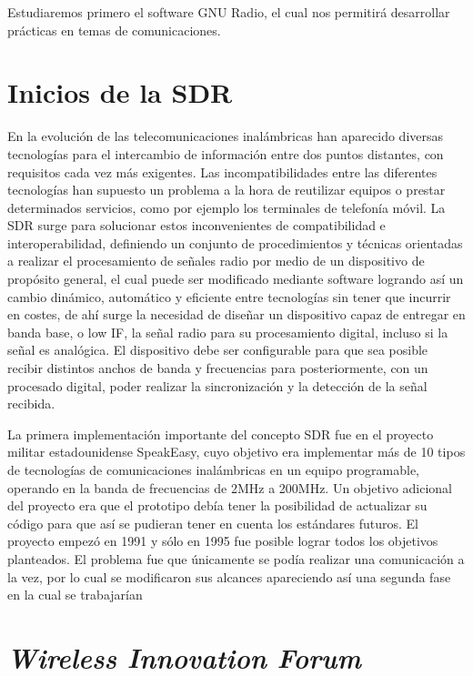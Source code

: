 Estudiaremos primero el software GNU Radio, el cual nos permitirá desarrollar prácticas en temas de comunicaciones.

\section{Inicios de la SDR}

En la evolución de las telecomunicaciones inalámbricas han aparecido diversas tecnologías
para el intercambio de información entre dos puntos distantes, con requisitos cada vez más
exigentes. Las incompatibilidades entre las diferentes tecnologías han supuesto un problema a la hora de reutilizar equipos o prestar determinados servicios, como por ejemplo los terminales de telefonía móvil. La SDR surge para solucionar estos inconvenientes de compatibilidad e interoperabilidad, definiendo un conjunto de procedimientos y técnicas orientadas a realizar el procesamiento de señales radio por medio de un dispositivo de propósito general, el cual puede ser modificado mediante software logrando así un cambio dinámico, automático y eficiente entre tecnologías sin tener que incurrir en costes, de ahí surge la necesidad de diseñar un dispositivo capaz de entregar en banda base, o low IF, la señal radio para su procesamiento digital, incluso si la señal es analógica. El dispositivo debe ser configurable para que sea posible recibir distintos anchos de banda y frecuencias para posteriormente, con un procesado digital, poder realizar la sincronización y la detección de la señal recibida.

La primera implementación importante del concepto SDR fue en el proyecto militar estadounidense SpeakEasy, cuyo objetivo era implementar más de 10 tipos de tecnologías de comunicaciones inalámbricas en un equipo programable, operando en la banda de frecuencias de 2MHz a 200MHz. Un objetivo adicional del proyecto era que el prototipo debía tener la posibilidad de actualizar su código para que así se pudieran tener en cuenta los estándares futuros. El proyecto empezó en 1991 y sólo en 1995 fue posible lograr todos los objetivos planteados. El problema fue que únicamente se podía realizar una comunicación a la vez, por lo cual se modificaron sus alcances apareciendo así una segunda fase en la cual se trabajarían

\section{\textit{Wireless Innovation Forum}}

